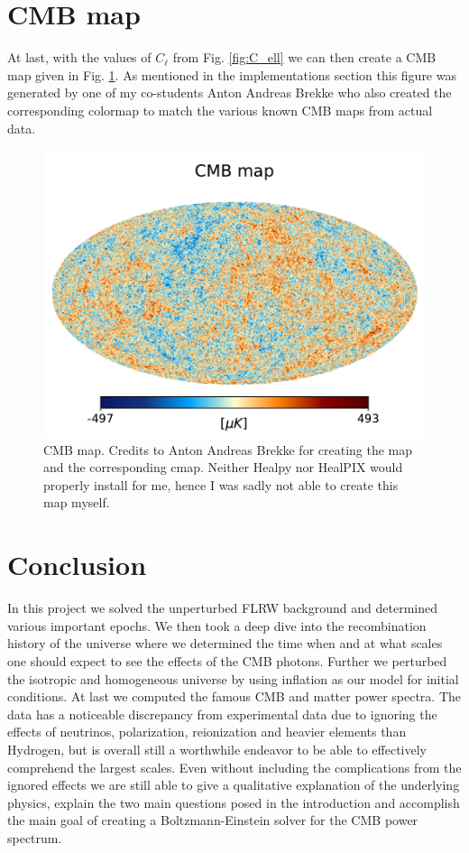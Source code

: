 \documentclass[%
reprint,
 amsmath,amssymb,
 aps,
]{revtex4-2}
\begin{document}
\section{CMB map}
At last, with the values of $C_\ell$ from Fig. \ref{fig:C_ell} we can then create a CMB map given in Fig. \ref{fig:CMB_Map}. As mentioned in the implementations section this figure was generated by one of my co-students Anton Andreas Brekke who also created the corresponding colormap to match the various known CMB maps from actual data. 
\begin{figure}[ht!]
	\includegraphics[width = \linewidth]{Milestone4/Figures/CMB_map.pdf}
	\caption{CMB map. Credits to Anton Andreas Brekke for creating the map and the corresponding cmap. Neither Healpy nor HealPIX would properly install for me, hence I was sadly not able to create this map myself.}
	\label{fig:CMB_Map}
\end{figure}

\section{Conclusion}
In this project we solved the unperturbed FLRW background and determined various important epochs. We then took a deep dive into the recombination history of the universe where we determined the time when and at what scales one should expect to see the effects of the CMB photons. Further we perturbed the isotropic and homogeneous universe by using inflation as our model for initial conditions. At last we computed the famous CMB and matter power spectra. The data has a noticeable discrepancy from experimental data due to ignoring the effects of neutrinos, polarization, reionization and heavier elements than Hydrogen, but is overall still a worthwhile endeavor to be able to effectively comprehend the largest scales. Even without including the complications from the ignored effects we are still able to give a qualitative explanation of the underlying physics, explain the two main questions posed in the introduction and accomplish the main goal of creating a Boltzmann-Einstein solver for the CMB power spectrum.
\end{document}
